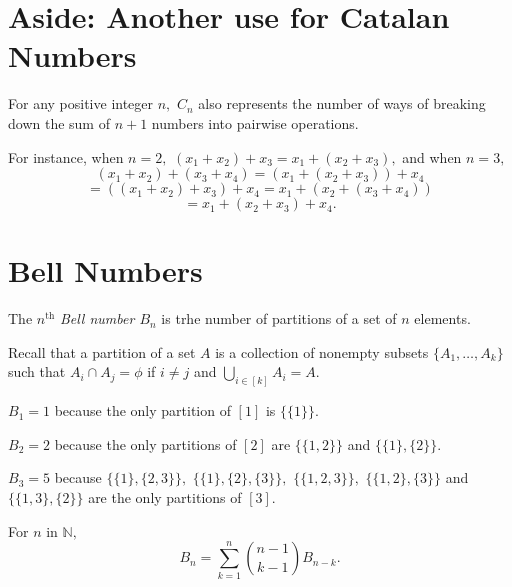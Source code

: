 \section{Aside: Another use for Catalan Numbers}
For any positive integer $n,$ $C_n$ also represents the number of ways
of breaking down the sum of $n+1$ numbers into pairwise operations.

For instance, when $n=2,$
$(x_1+  x_2) + x_3 = x_1  +(x_2 + x_3),$ and
when $n=3,$ 
$$(x_1 + x_2) + (x_3 + x_4) = (x_1 + (x_2 + x_3)) + x_4 $$
$$ = ((x_1 + x_2) + x_3) + x_4 = x_1 + (x_2 + (x_3 + x_4))$$
$$ = x_1 + (x_2 + x_3 ) +x_4 .$$

\section{Bell Numbers}
\begin{definition}
The $n^\text{th}$ \emph{Bell number $B_n$} is trhe number of partitions
of a set of $n$ elements.
\end{definition}

Recall that a partition of a set $A$ is a collection of nonempty
subsets $ \{ A_1, \dotsc, A_k\}$ such that 
$A_i \cap A_j =  \phi$ if $i \not = j$ and $\bigcup_{i \in [k]} A_i = A.$

\begin{example}
	$B_1 = 1$ because the only partition of $[1]$ is $\{\{1\}\}.$

	$B_2 = 2$ because the only partitions of $[2]$ are
	$\{ \{ 1,2\} \}$ and $\{ \{1\}, \{2\} \}.$

	$B_3 = 5$ because $\{ \{ 1\} , \{ 2, 3\} \},$ 
	$\{ \{1 \}, \{2\}, \{3\}\},$ $\{ \{ 1,2,3\}\},$
	$\{ \{1, 2\}, \{3\}\}$ and $\{ \{1,3\}, \{2\}\}$
	are the only partitions of $[3].$
\end{example}

\begin{lemma}
	For $n$ in $\mathbb{N},$
	$$ B_n = \sum_{k = 1}^{n} \binom{n-1}{k-1} B_{n-k}.$$
\end{lemma}

